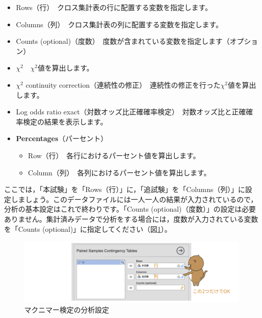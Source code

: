 \documentclass[
  12pt,
  a5jpaper,
  lualatex, ja=standard]{bxjsbook}
\providecommand{\tightlist}{%
  \setlength{\itemsep}{0pt}\setlength{\parskip}{0pt}}
\newenvironment{jmvsettings}{%
	\begin{center}%
	\begin{tcolorbox}[%
		title=設定項目,
		colframe=gmoji,
		colbacktitle=gmoji,
		colback=gmoji!2!white,
		breakable,
		width=.9\textwidth,
		]\small\addtolength{\leftmargini}{-3\labelsep}%
	}%
	{\end{tcolorbox}\end{center}}
\begin{document}
\begin{jmvsettings}

\begin{itemize}
\tightlist
\item
  Rows（行）　クロス集計表の行に配置する変数を指定します。
\item
  Columns（列）　クロス集計表の列に配置する変数を指定します。
\item
  Counts (optional)（度数）　度数が含まれている変数を指定します（オプション）
\item
  \(\chi^2\)　\(\chi^2\)値を算出します。
\item
  \(\chi^2\) continuity correction（連続性の修正）　連続性の修正を行った\(\chi^2\)値を算出します。
\item
  Log odds ratio exact（対数オッズ比正確確率検定）　対数オッズ比と正確確率検定の結果を表示します。
\item
  \textbf{Percentages}（パーセント）

  \begin{itemize}
  \tightlist
  \item
    Row（行）　各行におけるパーセント値を算出します。
  \item
    Column（列）　各列におけるパーセント値を算出します。
  \end{itemize}
\end{itemize}

\end{jmvsettings}

ここでは，「本試験」を「Rows（行）」に，「追試験」を「Columns（列）」に設定しましょう。このデータファイルには一人一人の結果が入力されているので，分析の基本設定はこれで終わりです。「Counts (optional)（度数）」の設定は必要ありません。集計済みデータで分析をする場合には，度数が入力されている変数を「Counts (optional)」に指定してください（図\ref{fig:frequencies-mcnemar-set-var}）。

\begin{figure}[!ht]

{\centering \includegraphics[width=1\linewidth]{images/frequencies/mcnemar-set-var} 

}

\caption{マクニマー検定の分析設定}\label{fig:frequencies-mcnemar-set-var}
\end{figure}
\end{document}
